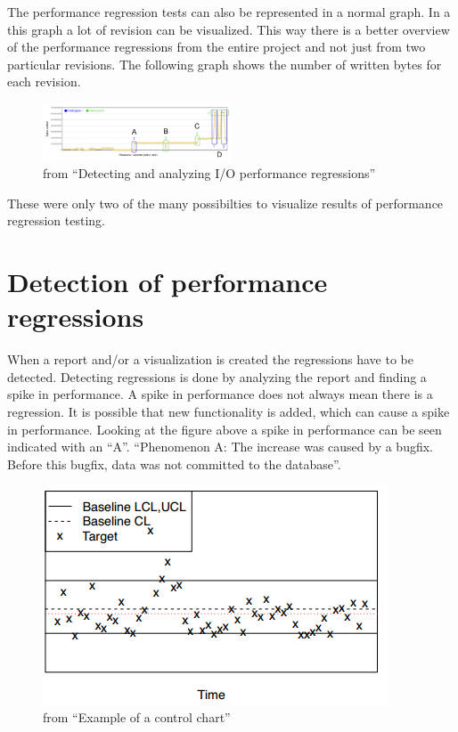 The performance regression tests can also be represented in a normal graph. In a this graph a lot of revision can be visualized. This way there is a better overview of the performance regressions from the entire project and not just from two particular revisions. The following graph shows the number of written bytes for each revision.

\begin{figure}[h]
\begin{center}
  \includegraphics[width=0.5\textwidth]{Figures/bytegraph.png}
\end{center}
  \caption{from ``Detecting and analyzing I/O performance regressions''\cite{bezemer2014detecting}}

\end{figure}

These were only two of the many possibilties to visualize results of performance regression testing.

\section{Detection of performance regressions}
When a report and/or a visualization is created the regressions have to be detected. Detecting regressions is done by analyzing the report and finding a spike in performance. A spike in performance does not always mean there is a regression. It is possible that new functionality is added, which can cause a spike in performance. Looking at the figure above a spike in performance can be seen indicated with an ``A''. ``Phenomenon A: The increase was caused by a bugfix. Before this bugfix, data was not committed to the database''\cite{bezemer2014detecting}.\newline


\begin{figure}[h]
\begin{center}
  \includegraphics[scale=0.7]{Figures/controlchart.png}
\end{center}
  \caption{from ``Example of a control chart''\cite{nguyen2012using}}

\end{figure}




